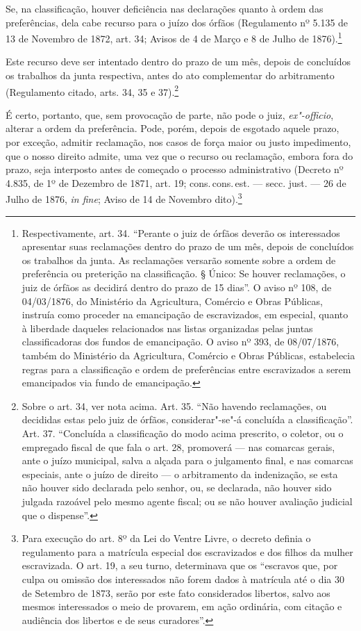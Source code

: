 Se, na classificação, houver deficiência nas declarações quanto à ordem
das preferências, dela cabe recurso para o juízo dos órfãos (Regulamento
nº 5.135 de 13 de Novembro de 1872, art. 34; Avisos de 4 de Março e 8 de
Julho de 1876).\footnote{Respectivamente, art. 34. ``Perante o juiz de
  órfãos deverão os interessados apresentar suas reclamações dentro do
  prazo de um mês, depois de concluídos os trabalhos da junta. As
  reclamações versarão somente sobre a ordem de preferência ou
  preterição na classificação. § Único: Se houver reclamações, o juiz de
  órfãos as decidirá dentro do prazo de 15 dias''. O aviso nº 108, de
  04/03/1876, do Ministério da Agricultura, Comércio e Obras Públicas,
  instruía como proceder na emancipação de escravizados, em especial,
  quanto à liberdade daqueles relacionados nas listas organizadas pelas
  juntas classificadoras dos fundos de emancipação. O aviso nº 393, de
  08/07/1876, também do Ministério da Agricultura, Comércio e Obras
  Públicas, estabelecia regras para a classificação e ordem de
  preferências entre escravizados a serem emancipados via fundo de
  emancipação.}

Este recurso deve ser intentado dentro do prazo de um mês, depois de
concluídos os trabalhos da junta respectiva, antes do ato complementar
do arbitramento (Regulamento citado, arts. 34, 35 e 37).\footnote{
  Sobre o art. 34, ver nota acima. Art. 35. ``Não havendo reclamações, ou
  decididas estas pelo juiz de órfãos, considerar"-se"-á concluída a
  classificação''. Art. 37. ``Concluída a classificação do modo acima
  prescrito, o coletor, ou o empregado fiscal de que fala o art. 28,
  promoverá --- nas comarcas gerais, ante o juízo municipal, salva a
  alçada para o julgamento final, e nas comarcas especiais, ante o juízo
  de direito --- o arbitramento da indenização, se esta não houver sido
  declarada pelo senhor, ou, se declarada, não houver sido julgada
  razoável pelo mesmo agente fiscal; ou se não houver avaliação judicial
  que o dispense''.}

É certo, portanto, que, sem provocação de parte, não pode o juiz,
\emph{ex"-officio}, alterar a ordem da preferência. Pode, porém, depois
de esgotado aquele prazo, por exceção, admitir reclamação, nos casos de
força maior ou justo impedimento, que o nosso direito admite, uma vez
que o recurso ou reclamação, embora fora do prazo, seja interposto antes
de começado o processo administrativo (Decreto nº 4.835, de 1º de
Dezembro de 1871, art. 19; cons.\,cons.\,est. --- secc. just. --- 26 de Julho
de 1876, \emph{in fine}; Aviso de 14 de Novembro dito).\footnote{Para
  execução do art. 8º da Lei do Ventre Livre, o decreto definia o
  regulamento para a matrícula especial dos escravizados e dos filhos da
  mulher escravizada. O art. 19, a seu turno, determinava que os
  ``escravos que, por culpa ou omissão dos interessados não forem dados à
  matrícula até o dia 30 de Setembro de 1873, serão por este fato
  considerados libertos, salvo aos mesmos interessados o meio de
  provarem, em ação ordinária, com citação e audiência dos libertos e de
  seus curadores''.}

